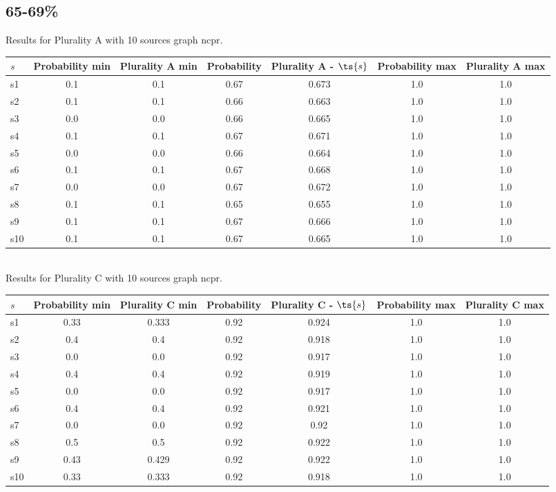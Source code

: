 \documentclass{article}
\begin{document}
\newpage

\subsection{65-69\%}

\noindent Results for Plurality A with 10 sources graph ncpr.

\noindent\begin{tabular}{|l|c|c|c|c|c|c|}
\hline
$s$& Probability min & Plurality A min & Probability & Plurality A - $\ts{s}$ & Probability max & Plurality A max\\
\hline
s1 &0.1 & 0.1 & 0.67 & 0.673 & 1.0 & 1.0\\
\hline
s2 &0.1 & 0.1 & 0.66 & 0.663 & 1.0 & 1.0\\
\hline
s3 &0.0 & 0.0 & 0.66 & 0.665 & 1.0 & 1.0\\
\hline
s4 &0.1 & 0.1 & 0.67 & 0.671 & 1.0 & 1.0\\
\hline
s5 &0.0 & 0.0 & 0.66 & 0.664 & 1.0 & 1.0\\
\hline
s6 &0.1 & 0.1 & 0.67 & 0.668 & 1.0 & 1.0\\
\hline
s7 &0.0 & 0.0 & 0.67 & 0.672 & 1.0 & 1.0\\
\hline
s8 &0.1 & 0.1 & 0.65 & 0.655 & 1.0 & 1.0\\
\hline
s9 &0.1 & 0.1 & 0.67 & 0.666 & 1.0 & 1.0\\
\hline
s10 &0.1 & 0.1 & 0.67 & 0.665 & 1.0 & 1.0\\
\hline
\end{tabular}\\

\noindent Results for Plurality C with 10 sources graph ncpr.

\noindent\begin{tabular}{|l|c|c|c|c|c|c|}
\hline
$s$& Probability min & Plurality C min & Probability & Plurality C - $\ts{s}$ & Probability max & Plurality C max\\
\hline
s1 &0.33 & 0.333 & 0.92 & 0.924 & 1.0 & 1.0\\
\hline
s2 &0.4 & 0.4 & 0.92 & 0.918 & 1.0 & 1.0\\
\hline
s3 &0.0 & 0.0 & 0.92 & 0.917 & 1.0 & 1.0\\
\hline
s4 &0.4 & 0.4 & 0.92 & 0.919 & 1.0 & 1.0\\
\hline
s5 &0.0 & 0.0 & 0.92 & 0.917 & 1.0 & 1.0\\
\hline
s6 &0.4 & 0.4 & 0.92 & 0.921 & 1.0 & 1.0\\
\hline
s7 &0.0 & 0.0 & 0.92 & 0.92 & 1.0 & 1.0\\
\hline
s8 &0.5 & 0.5 & 0.92 & 0.922 & 1.0 & 1.0\\
\hline
s9 &0.43 & 0.429 & 0.92 & 0.922 & 1.0 & 1.0\\
\hline
s10 &0.33 & 0.333 & 0.92 & 0.918 & 1.0 & 1.0\\
\hline
\end{tabular}\\
\end{document}
